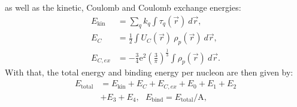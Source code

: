 \documentclass[3p]{elsarticle}
\begin{document}
as well as the kinetic, Coulomb and Coulomb exchange energies:
\begin{align}
E_\mathrm{kin} &= \sum\nolimits_{q} k_q \int  \tau_q(\vec{r}) \: d \vec{r}, 
\label{energy_kin}\\
E_{C} &= \frac{1}{2} \int U_C  (\vec{r}) \: \rho_p (\vec{r}) \: d \vec{r}, \\
E_{C,ex} &= - \frac{3}{4} \mathrm{e}^2 \left( \frac{3}{\pi} \right)^\frac{1}{3} \int \rho_p (\vec{r}) \: d \vec{r}.
\label{energy_coulomb_ex}
\end{align}
With that, the total energy and binding energy per nucleon are then given by:
\begin{align}
E_\mathrm{total} &= E_\mathrm{kin} + E_C + E_{C,ex} + E_0 + E_1 + E_2 \nonumber\\
& + E_3 + E_4, \:\:\: E_\mathrm{bind} = E_\mathrm{total} / \mathrm{A}, 
\label{energy_total}
\end{align}
\end{document}
